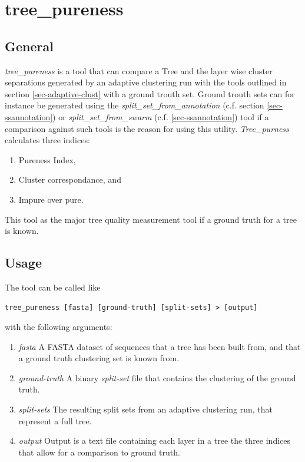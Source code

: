 \section{tree\_pureness} \label{sec-pureness}

\subsection{General}

\emph{tree\_pureness} is a tool that can compare a Tree and the layer wise
cluster separations generated by an adaptive clustering run with the tools
outlined in section \ref{sec-adaptive-clust} with a ground trouth set.
Ground trouth sets can for instance be generated using the
\emph{split\_set\_from\_annotation} (c.f. section
\ref{sec-ssannotation}) or \emph{split\_set\_from\_swarm}
(c.f. \ref{sec-ssannotation})
tool if a comparison against such tools is the reason for using this
utility. \emph{Tree\_purness} calculates three indices:
\begin{enumerate}
\item Pureness Index,
\item Cluster correspondance,
  and
\item Impure over pure.
\end{enumerate}
This tool as the major tree quality measurement tool if a ground truth
for a tree is known. 

\subsection{Usage}
The tool can be called like
\begin{lstlisting}
tree_pureness [fasta] [ground-truth] [split-sets] > [output]
\end{lstlisting}
with the following arguments:
\begin{enumerate}
\item \emph{fasta} A FASTA dataset of sequences that a tree has been
  built from, and that a ground truth clustering set is known from.
\item \emph{ground-truth} A binary \emph{split-set} file that contains
  the clustering of the ground truth.
\item \emph{split-sets} The resulting split sets from an adaptive
  clustering run, that represent a full tree.
\item \emph{output} Output is a text file containing each layer in a
  tree the three indices that allow for a comparison to ground truth.
\end{enumerate}

